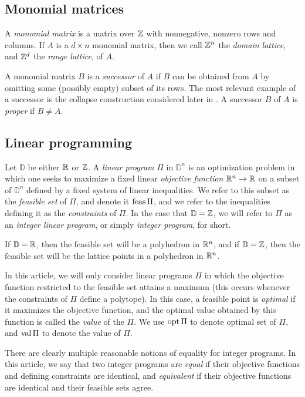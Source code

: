 \documentclass[11pt]{amsart}
\begin{document}
\subsection{Monomial matrices}  A \emph{monomial matrix} is a matrix over $\mathbb{Z}$ with nonnegative, nonzero rows and columns.   If $A$ is a $d \times n$ monomial matrix, then we call $\mathbb{Z}^n$ the \emph{domain lattice}, and $\mathbb{Z}^d$ the \emph{range lattice}, of $A$.

A  monomial matrix $B$ is a \emph{successor} of $A$ if $B$ can be obtained from $A$ by omitting some (possibly empty) subset of its rows.   The most relevant example of a successor is the collapse construction considered later in .  A successor $B$ of $A$ is  \emph{proper} if $B \neq A$.



\subsection{Linear programming}  

Let $\mathbb{D}$ be either $\mathbb{R}$ or $\mathbb{Z}$.
A \emph{linear program} $\Pi$ in $\mathbb{D}^n$ is an optimization problem in which one seeks to maximize a fixed linear \emph{objective function} $\mathbb{R}^n \to \mathbb{R}$ on a subset of $\mathbb{D}^n$ defined by a fixed system of linear inequalities.
We refer to this subset as the \emph{feasible set} of $\Pi$, and denote it $\operatorname{feas} \Pi$, and we refer to the inequalities defining it as the \emph{constraints} of $\Pi$.  
In the case that $\mathbb{D} = \mathbb{Z}$, we will refer to $\Pi$ as an \emph{integer linear program}, or simply \emph{integer program}, for short.  

If $\mathbb{D} = \mathbb{R}$, then the feasible set  will be a polyhedron in $\mathbb{R}^n$, and if $\mathbb{D} = \mathbb{Z}$, then the feasible set will be the lattice points in a polyhedron in $\mathbb{R}^n$.  

In this article, we will only consider linear programs $\Pi$ in which the objective function restricted to the feasible set attains a maximum (\eg this occurs whenever the constraints of $\Pi$ define a polytope).
In this case, a feasible point is \emph{optimal} if it maximizes the objective function, and the optimal value obtained by this function is called the \emph{value} of the $\Pi$.
We use $\operatorname{opt} \Pi$ to denote optimal set of $\Pi$, and $\operatorname{val} \Pi$ to denote the value of $\Pi$. 

There are clearly multiple reasonable notions of equality for integer programs.
In this article,  we say that two integer programs are \emph{equal} if their objective functions and defining constraints are identical, and \emph{equivalent} if their objective functions are identical and their feasible sets agree. 
\end{document}
